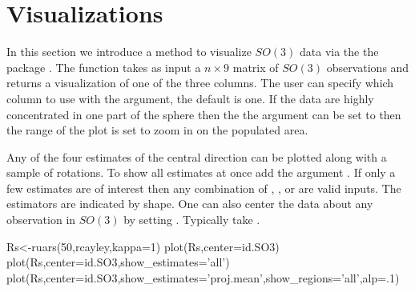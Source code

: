 \section{Visualizations}
In this section we introduce a method to visualize $SO(3)$ data via the the  package \citep{wickham2009}.  The function  takes as input a $n\times 9$ matrix of $SO(3)$ observations and returns a visualization of one of the three columns.  The user can specify which column to use with the  argument, the default is one.  If the data are highly concentrated in one part of the sphere then the the  argument can be set to  then the range of the plot is set to zoom in on the populated area. 

Any of the four estimates of the central direction can be plotted along with a sample of rotations. To show all estimates at once add the argument .  If only a few estimates are of interest then any combination of , ,  or  are valid inputs.  The estimators are indicated by shape.  One can also center the data about any observation in $SO(3)$ by setting .   Typically take .  

\begin{example}
Rs<-ruars(50,rcayley,kappa=1)
plot(Rs,center=id.SO3)
plot(Rs,center=id.SO3,show_estimates='all')
plot(Rs,center=id.SO3,show_estimates='proj.mean',show_regions='all',alp=.1)
\end{example}




